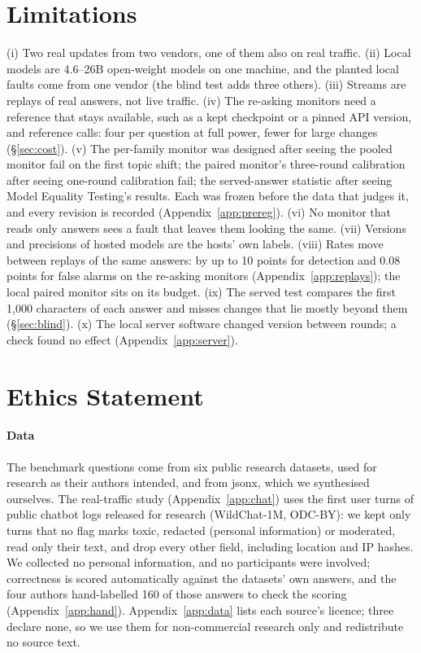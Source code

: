\documentclass{article}
\begin{document}
\section*{Limitations}
(i) Two real updates from two vendors, one of them also on real traffic. (ii) Local models are 4.6--26B open-weight models on one
machine, and the planted local faults come from one vendor (the blind test adds
three others). (iii) Streams are replays of
real answers, not live traffic. (iv) The re-asking monitors need a reference that
stays available, such as a kept checkpoint or a pinned API version, and reference
calls: four per question at full power, fewer for large changes (\S\ref{sec:cost}). (v) The per-family monitor was designed
after seeing the pooled monitor fail on the first topic shift; the paired monitor's
three-round calibration after seeing one-round calibration fail; the served-answer
statistic after seeing Model Equality Testing's results. Each was frozen before the
data that judges it, and every revision is recorded (Appendix~\ref{app:prereg}).
(vi) No monitor that reads only answers sees a fault that leaves them looking the
same. (vii) Versions and precisions of hosted models are the hosts' own labels.
(viii) Rates move between replays of the same answers: by up to 10 points for
detection and 0.08 points for false alarms on the re-asking monitors
(Appendix~\ref{app:replays}); the local paired monitor sits on its budget.
(ix) The served test compares the first 1{,}000 characters of each answer and
misses changes that lie mostly beyond them (\S\ref{sec:blind}). (x) The local server software
changed version between rounds; a check found no effect (Appendix~\ref{app:server}).

\section*{Ethics Statement}
\paragraph{Data} The benchmark questions come from six public research datasets,
used for research as their authors intended, and from \textsf{jsonx}, which we
synthesised ourselves. The real-traffic study (Appendix~\ref{app:chat}) uses the
first user turns of public chatbot logs released for research (WildChat-1M,
ODC-BY): we kept only turns that no flag marks toxic, redacted (personal
information) or moderated, read only their text, and drop every other field,
including location and IP hashes. We collected no personal information, and no
participants were involved; correctness is scored automatically against the
datasets' own answers, and the four authors hand-labelled 160 of those answers to
check the scoring (Appendix~\ref{app:hand}). Appendix~\ref{app:data} lists each source's licence; three declare none, so we use them for non-commercial research only and redistribute no source text.
\end{document}
